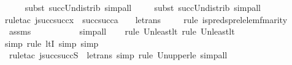 \begin{isabellebody}
\ \ \ \ \isamarkupfalse%
{\isacharparenleft}{\kern0pt}subst\ succ{\isacharunderscore}{\kern0pt}Un{\isacharunderscore}{\kern0pt}distrib{\isacharcomma}{\kern0pt}\ simp{\isacharunderscore}{\kern0pt}all{\isacharparenright}{\kern0pt}\isanewline
\ \ \ \ \isamarkupfalse%
{\isacharparenleft}{\kern0pt}subst\ succ{\isacharunderscore}{\kern0pt}Un{\isacharunderscore}{\kern0pt}distrib{\isacharcomma}{\kern0pt}\ simp{\isacharunderscore}{\kern0pt}all{\isacharparenright}{\kern0pt}\isanewline
\ \ \ \isamarkupfalse%
{\isacharparenleft}{\kern0pt}rule{\isacharunderscore}{\kern0pt}tac\ j{\isacharequal}{\kern0pt}{\isachardoublequoteopen}succ{\isacharparenleft}{\kern0pt}succ{\isacharparenleft}{\kern0pt}x{\isacharparenright}{\kern0pt}{\isacharparenright}{\kern0pt}\ {\isasymunion}\ succ{\isacharparenleft}{\kern0pt}succ{\isacharparenleft}{\kern0pt}a{\isacharparenright}{\kern0pt}{\isacharparenright}{\kern0pt}\ {\isasymunion}\ {}{\isachardoublequoteclose}\ \ le{\isacharunderscore}{\kern0pt}trans{\isacharparenright}{\kern0pt}\isanewline
\ \ \ \ \isamarkupfalse%
{\isacharparenleft}{\kern0pt}rule\ is{\isacharunderscore}{\kern0pt}preds{\isacharunderscore}{\kern0pt}prel{\isacharunderscore}{\kern0pt}elem{\isacharunderscore}{\kern0pt}fm{\isacharunderscore}{\kern0pt}arity{\isacharparenright}{\kern0pt}\isanewline
\ \ \isamarkupfalse%
\ assms\ \isanewline
\ \ \ \ \ \ \ \ \isamarkupfalse%
\ simp{\isacharunderscore}{\kern0pt}all\isanewline
\ \ \ \isamarkupfalse%
{\isacharparenleft}{\kern0pt}rule\ Un{\isacharunderscore}{\kern0pt}least{\isacharunderscore}{\kern0pt}lt{\isacharcomma}{\kern0pt}\ rule\ Un{\isacharunderscore}{\kern0pt}least{\isacharunderscore}{\kern0pt}lt{\isacharparenright}{\kern0pt}\isanewline
\ \ \ \ \ \isamarkupfalse%
{\isacharparenleft}{\kern0pt}simp{\isacharcomma}{\kern0pt}\ rule\ ltI{\isacharcomma}{\kern0pt}\ simp{\isacharcomma}{\kern0pt}\ simp{\isacharparenright}{\kern0pt}{\isacharplus}{\kern0pt}\isanewline
\ \ \ \isamarkupfalse%
\ {\isacharparenleft}{\kern0pt}rule{\isacharunderscore}{\kern0pt}tac\ j{\isacharequal}{\kern0pt}{\isachardoublequoteopen}succ{\isacharparenleft}{\kern0pt}succ{\isacharparenleft}{\kern0pt}S{\isacharparenright}{\kern0pt}{\isacharparenright}{\kern0pt}{\isachardoublequoteclose}\ \ le{\isacharunderscore}{\kern0pt}trans{\isacharcomma}{\kern0pt}\ simp{\isacharcomma}{\kern0pt}\ rule\ Un{\isacharunderscore}{\kern0pt}upper{}{\isacharunderscore}{\kern0pt}le{\isacharcomma}{\kern0pt}\ simp{\isacharunderscore}{\kern0pt}all{\isacharparenright}{\kern0pt}\isanewline

\end{isabellebody}

